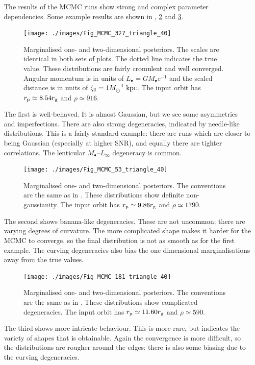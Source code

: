 The results of the MCMC runs show strong and complex parameter dependencies. Some example results are shown in , \ref{fig:MCMC-2} and \ref{fig:MCMC-3}.
\begin{figure}%
\centering
\vspace{0.5\baselineskip}
   \texttt{[image: ./images/Fig\_MCMC\_327\_triangle\_40]}
\caption{Marginalised one- and two-dimensional posteriors. The scales are identical in both sets of plots. The dotted line indicates the true value. These distributions are fairly cromulent and well converged. Angular momentum is in units of $L_\bullet = GM_\bullet c^{-1}$  and the scaled distance is in units of $\zeta_0 = 1 M_\odot^{-1}~\mathrm{kpc}$. The input orbit has $r_\mathrm{p} \simeq 8.54 r_\mathrm{g}$ and $\rho \simeq 916$.}
\label{fig:MCMC-1}
\end{figure}
The first is well-behaved. It is almost Gaussian, but we see some asymmetries and imperfections. There are also strong degeneracies, indicated by needle-like distributions. This is a fairly standard example: there are runs which are closer to being Gaussian (especially at higher SNR), and equally there are tighter correlations. The lenticular $M_\bullet$--$L_\infty$ degeneracy is common.

\begin{figure}%
\centering
\vspace{0.5\baselineskip}
   \texttt{[image: ./images/Fig\_MCMC\_53\_triangle\_40]}
\caption{Marginalised one- and two-dimensional posteriors. The conventions are the same as in . These distributions show definite non-gaussianity. The input orbit has $r_\mathrm{p} \simeq 9.86 r_\mathrm{g}$ and $\rho \simeq 1790$.}
\label{fig:MCMC-2}
\end{figure}
The second shows banana-like degeneracies. These are not uncommon; there are varying degrees of curvature. The more complicated shape makes it harder for the MCMC to converge, so the final distribution is not as smooth as for the first example. The curving degeneracies also bias the one dimensional marginalisations away from the true values.

\begin{figure}%
\centering
\vspace{0.5\baselineskip}
   \texttt{[image: ./images/Fig\_MCMC\_181\_triangle\_40]}
\caption{Marginalised one- and two-dimensional posteriors. The conventions are the same as in . These distributions show complicated degeneracies. The input orbit has $r_\mathrm{p} \simeq 11.60 r_\mathrm{g}$ and $\rho \simeq 590$.}
\label{fig:MCMC-3}
\end{figure}
The third shows more intricate behaviour. This is more rare, but indicates the variety of shapes that is obtainable. Again the convergence is more difficult, so the distributions are rougher around the edges; there is also some biasing due to the curving degeneracies.

